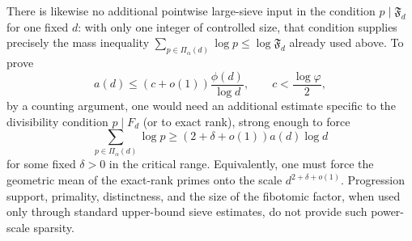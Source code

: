 \begin{remark}
There is likewise no additional pointwise large-sieve input in the
condition $p\mid\mathfrak F_d$ for one fixed $d$: with only one integer of
controlled size, that condition supplies precisely the mass inequality
$\sum_{p\in\Pi_\alpha(d)}\log p\leq\log\mathfrak F_d$ already used above.
To prove
\[
 a(d)\leq(c+o(1))\frac{\phi(d)}{\log d},
 \qquad c<\frac{\log\varphi}{2},
\]
by a counting argument, one would need an additional estimate specific to
the divisibility condition $p\mid F_d$ (or to exact rank), strong enough to
force
\[
 \sum_{p\in\Pi_\alpha(d)}\log p
 \geq(2+\delta+o(1))a(d)\log d
\]
for some fixed $\delta>0$ in the critical range.  Equivalently, one must
force the geometric mean of the exact-rank primes onto the scale
$d^{2+\delta+o(1)}$.  Progression support, primality, distinctness, and the
size of the fibotomic factor, when used only through standard upper-bound
sieve estimates, do not provide such power-scale sparsity.
\end{remark}
